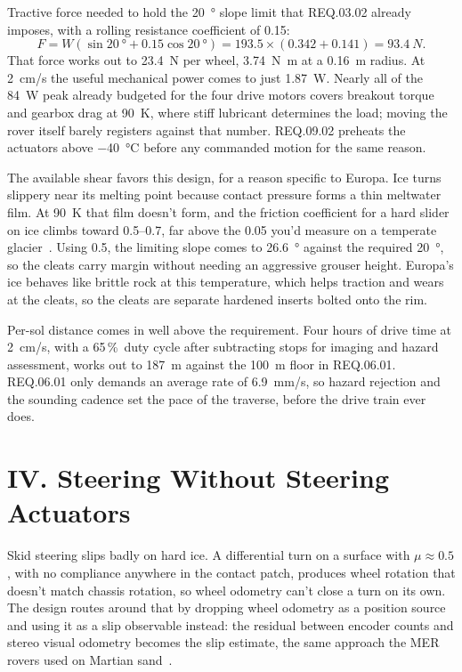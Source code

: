 \documentclass[11pt]{article}
\begin{document}
Tractive force needed to hold the \SI{20}{\degree} slope limit that REQ.03.02 already imposes, with a rolling
resistance coefficient of \num{0.15}:
\[
F = W\left(\sin\SI{20}{\degree} + 0.15\cos\SI{20}{\degree}\right)
  = 193.5 \times (0.342 + 0.141) = \SI{93.4}{N}.
\]
That force works out to \SI{23.4}{N} per wheel, \SI{3.74}{N.m} at a \SI{0.16}{m} radius. At \SI{2}{cm/s} the
useful mechanical power comes to just \SI{1.87}{W}. Nearly all of the \SI{84}{W} peak already budgeted for the
four drive motors covers breakout torque and gearbox drag at \SI{90}{K}, where stiff lubricant determines the
load; moving the rover itself barely registers against that number. REQ.09.02 preheats the actuators above
\SI{-40}{\degreeCelsius} before any commanded motion for the same reason.

The available shear favors this design, for a reason specific to Europa. Ice turns slippery near its melting
point because contact pressure forms a thin meltwater film. At \SI{90}{K} that film doesn't form, and the
friction coefficient for a hard slider on ice climbs toward \numrange{0.5}{0.7}, far above the \num{0.05} you'd
measure on a temperate glacier~\cite{kietzig}. Using \num{0.5}, the limiting slope comes to \SI{26.6}{\degree}
against the required \SI{20}{\degree}, so the cleats carry margin without needing an aggressive grouser height.
Europa's ice behaves like brittle rock at this temperature, which helps traction and wears at the cleats, so the
cleats are separate hardened inserts bolted onto the rim.

Per-sol distance comes in well above the requirement. Four hours of drive time at \SI{2}{cm/s}, with a 65\,\%\
duty cycle after subtracting stops for imaging and hazard assessment, works out to \SI{187}{m} against the
\SI{100}{m} floor in REQ.06.01. REQ.06.01 only demands an average rate of \SI{6.9}{mm/s}, so hazard rejection
and the sounding cadence set the pace of the traverse, before the drive train ever does.

\bigskip

\section*{IV. Steering Without Steering Actuators}

Skid steering slips badly on hard ice. A differential turn on a surface with $\mu \approx 0.5$, with no
compliance anywhere in the contact patch, produces wheel rotation that doesn't match chassis rotation, so wheel
odometry can't close a turn on its own. The design routes around that by dropping wheel odometry as a position
source and using it as a slip observable instead: the residual between encoder counts and stereo visual
odometry becomes the slip estimate, the same approach the MER rovers used on Martian sand~\cite{maimone}.
\end{document}
